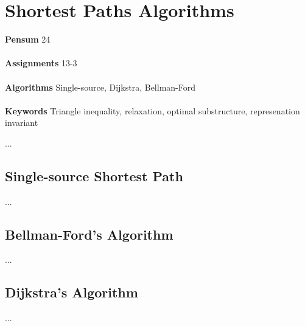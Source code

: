 
\chapter{Shortest Paths Algorithms}
\label{ch:shortestpathsalgorithms}

\textbf{Pensum} 24 \cite{clrs} \\\\
\textbf{Assignments} 13-3 \\\\
\textbf{Algorithms} Single-source, Dijkstra, Bellman-Ford \\\\
\textbf{Keywords} Triangle inequality, relaxation, optimal substructure,
represenation invariant
\vspace{1in}

\noindent ...

\newpage
\section{Single-source Shortest Path}
...

\section{Bellman-Ford's Algorithm}
...

\section{Dijkstra's Algorithm}
...

